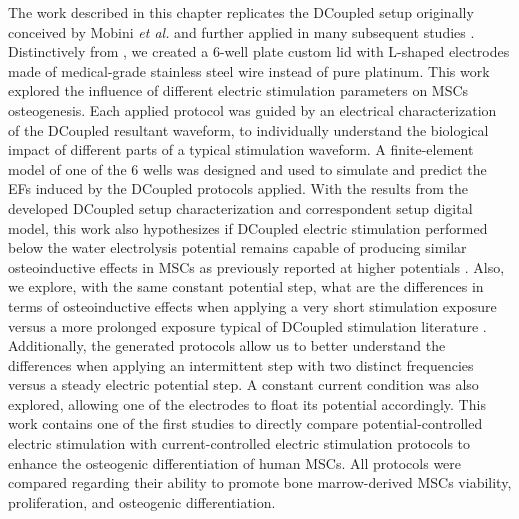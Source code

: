 The work described in this chapter replicates the \ac{DCoupled} setup originally conceived by Mobini \textit{et al.} \cite{Mobini2016-jh} and further applied in many subsequent studies \cite{Mobini2017-wp, Mobini2017-zr, Leppik2018-bw, Moon2023-rm}. Distinctively from \cite{Mobini2016-jh}, we created a 6-well plate custom lid with L-shaped electrodes made of medical-grade stainless steel wire instead of pure platinum. This work explored the influence of different electric stimulation parameters on \acs{MSCs} osteogenesis. Each applied protocol was guided by an electrical characterization of the \ac{DCoupled} resultant waveform, to individually understand the biological impact of different parts of a typical stimulation waveform. A finite-element model of one of the 6 wells was designed and used to simulate and predict the \ac{EFs} induced by the DCoupled protocols applied. With the results from the developed \ac{DCoupled} setup characterization and correspondent setup digital model, this work also hypothesizes if \ac{DCoupled} electric stimulation performed below the water electrolysis potential remains capable of producing similar osteoinductive effects in \ac{MSCs} as previously reported at higher potentials \cite{Mobini2016-jh, Mobini2017-wp, Mobini2017-zr, Leppik2018-bw}. Also, we explore, with the same constant potential step, what are the differences in terms of osteoinductive effects when applying a very short stimulation exposure versus a more prolonged exposure typical of DCoupled stimulation literature \cite{Mobini2016-jh, Mobini2017-wp, Mobini2017-zr, Leppik2018-bw}. Additionally, the generated protocols allow us to better understand the differences when applying an intermittent step with two distinct frequencies versus a steady electric potential step. A constant current condition was also explored, allowing one of the electrodes to float its potential accordingly. This work contains one of the first studies to directly compare potential-controlled electric stimulation with current-controlled electric stimulation protocols to enhance the osteogenic differentiation of human \acs{MSCs}. All protocols were compared regarding their ability to promote bone marrow-derived \acs{MSCs} viability, proliferation, and osteogenic differentiation.


